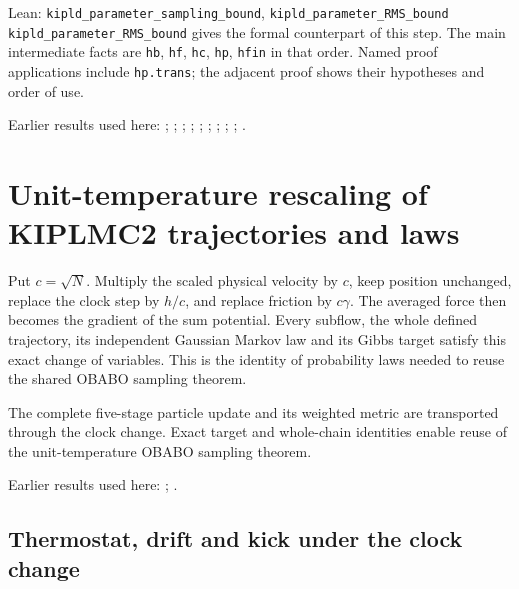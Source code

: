\documentclass[11pt,a4paper]{report}
\begin{document}
\begin{leanbox}{Lean: \texttt{kipld\_\allowbreak{}parameter\_\allowbreak{}sampling\_\allowbreak{}bound}, \texttt{kipld\_\allowbreak{}parameter\_\allowbreak{}RMS\_\allowbreak{}bound}}
\texttt{kipld\_\allowbreak{}parameter\_\allowbreak{}RMS\_\allowbreak{}bound} gives the formal counterpart of this step. The main intermediate facts are \texttt{hb}, \texttt{hf}, \texttt{hc}, \texttt{hp}, \texttt{hfin} in that order. Named proof applications include \texttt{hp.\allowbreak{}trans}; the adjacent proof shows their hypotheses and order of use.
\end{leanbox}


Earlier results used here: \cite[Section~3.17.4]{LangevinLean2026ULASC}; \cite[Section~3.26.15]{LangevinLean2026ULASC}; \cite[Section~3.1.1]{LangevinLean2026IPLA}; \cite[Section~3.1.3]{LangevinLean2026IPLA}; \cite[Section~3.1.6]{LangevinLean2026IPLA}; \cite[Section~3.3.1]{LangevinLean2026IPLA}; \cite[Section~3.3.2]{LangevinLean2026IPLA}; \cite[Section~3.5.1]{LangevinLean2026IPLA}; \cite[Section~3.9.9]{LangevinLean2026IPLA}; \cite[Section~3.115.1]{LangevinLean2026Kinetic}.
\section{\texorpdfstring{Unit-temperature rescaling of KIPLMC2 trajectories and laws}{Unit-temperature rescaling of KIPLMC2 trajectories and laws}}
\label{proof-module-KIPLMC-OBABORescaling-lean}


Put \(c=\sqrt N\). Multiply the scaled physical velocity by \(c\), keep position unchanged, replace the clock step by \(h/c\), and replace friction by \(c\gamma\). The averaged force then becomes the gradient of the sum potential. Every subflow, the whole defined trajectory, its independent Gaussian Markov law and its Gibbs target satisfy this exact change of variables. This is the identity of probability laws needed to reuse the shared OBABO sampling theorem.



The complete five-stage particle update and its weighted metric are transported through the clock change. Exact target and whole-chain identities enable reuse of the unit-temperature OBABO sampling theorem.



Earlier results used here: \cite[Section~3.51]{LangevinLean2026Kinetic}; \cite[Section~3.113]{LangevinLean2026Kinetic}.
\subsection{\texorpdfstring{Thermostat, drift and kick under the clock change}{Thermostat, drift and kick under the clock change}}
\label{report-step-KIPLMC-OBABORescaling-lean-1}
\end{document}
